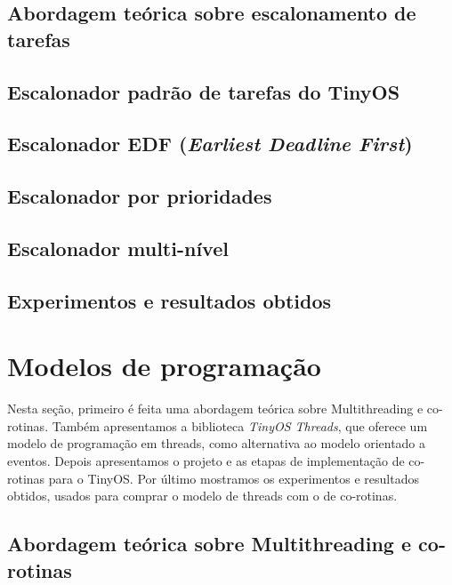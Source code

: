 \documentclass[a4paper, 10pt]{article}
\begin{document}
\subsection{Abordagem teórica sobre escalonamento de tarefas}\label{escalonador-teoria}


\subsection{Escalonador padrão de tarefas do TinyOS}\label{escalonadorpadrao}


\subsection{Escalonador EDF (\textit{Earliest Deadline First})}\label{escalonadoredf}


\subsection{Escalonador por prioridades}\label{escalonadorprioridade}


\subsection{Escalonador multi-nível}


\subsection{Experimentos e resultados obtidos}

\section{Modelos de programação}
Nesta seção, primeiro é feita uma abordagem teórica sobre Multithreading e co-rotinas. 
Também apresentamos a biblioteca \textit{TinyOS Threads}, que oferece um modelo de programação em threads, como
alternativa ao modelo orientado a eventos.
Depois apresentamos o projeto e as etapas de implementação de co-rotinas para o TinyOS.
Por último mostramos os experimentos e resultados obtidos, usados para comprar o modelo de threads com o de co-rotinas.

\subsection{Abordagem teórica sobre Multithreading e co-rotinas}

\end{document}
